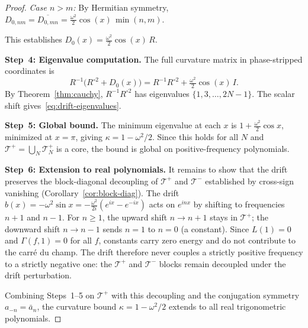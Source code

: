 \documentclass[11pt,a4paper]{article}
\theoremstyle{plain}
\theoremstyle{definition}
\theoremstyle{remark}
\begin{document}
\begin{proof}
\emph{Case $n > m$:}  By Hermitian symmetry, $D_{0,nm} = \overline{D_{0,mn}}
= \frac{\omega^2}{2}\cos(x)\,\min(n,m)$.

This establishes $D_0(x) = \frac{\omega^2}{2}\cos(x)\,R$.

\textbf{Step~4: Eigenvalue computation.}
The full curvature matrix in phase-stripped coordinates is
\[
  R^{-1}\bigl(R^{\circ 2} + D_0(x)\bigr)
  = R^{-1}R^{\circ 2} + \tfrac{\omega^2}{2}\cos(x)\,I.
\]
By Theorem~\ref{thm:cauchy}, $R^{-1}R^{\circ 2}$ has eigenvalues
$\{1,3,\ldots,2N{-}1\}$.  The scalar shift
gives~\eqref{eq:drift-eigenvalues}.

\textbf{Step~5: Global bound.}
The minimum eigenvalue at each $x$ is $1 + \frac{\omega^2}{2}\cos x$,
minimized at $x = \pi$, giving $\kappa = 1 - \omega^2/2$.
Since this holds for all $N$ and $\mathcal{T}^+ = \bigcup_N \mathcal{T}_N^+$
is a core, the bound is global on positive-frequency polynomials.

\textbf{Step~6: Extension to real polynomials.}
It remains to show that the drift preserves the
block-diagonal decoupling of $\mathcal{T}^+$ and
$\mathcal{T}^-$ established by cross-sign vanishing
(Corollary~\ref{cor:block-diag}).
The drift $b(x) = -\omega^2\sin x
= -\frac{\omega^2}{2i}(e^{ix}-e^{-ix})$
acts on $e^{inx}$ by shifting to frequencies $n+1$ and $n-1$.
For $n \geq 1$, the upward shift $n \to n+1$ stays in
$\mathcal{T}^+$; the downward shift $n \to n-1$ sends
$n = 1$ to $n = 0$ (a constant).  Since $L(1) = 0$
and $\Gamma(f, 1) = 0$ for all $f$, constants carry
zero energy and do not contribute to the carr\'e du champ.
The drift therefore never couples a strictly positive
frequency to a strictly negative one: the $\mathcal{T}^+$
and $\mathcal{T}^-$ blocks remain decoupled under the
drift perturbation.

Combining Steps~1--5 on $\mathcal{T}^+$ with this
decoupling and the conjugation symmetry $a_{-n} = \bar{a}_n$,
the curvature bound $\kappa = 1 - \omega^2/2$ extends to
all real trigonometric polynomials.
\end{proof}
\end{document}
